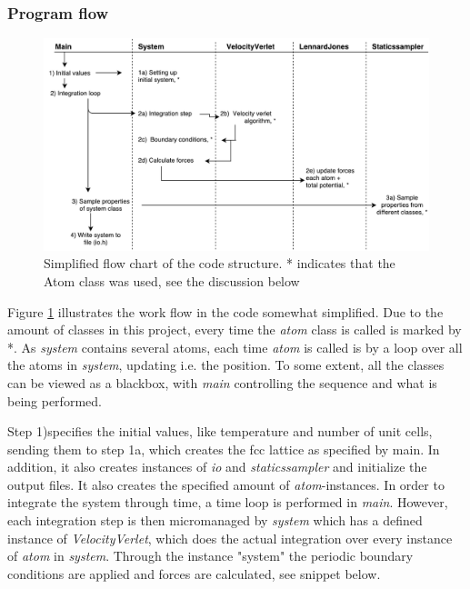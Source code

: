 \subsubsection{Program flow}

\begin{figure}[H]
	\centering
	\includegraphics[width=1\linewidth]{../figures/klasser_proj5}
	\caption{Simplified flow chart of the code structure. * indicates that the Atom class was used, see the discussion below}
	\label{fig:klasserproj5}
\end{figure}

Figure \ref{fig:klasserproj5} illustrates the work flow in the code somewhat simplified. Due to the amount of classes in this project, every time the \textit{atom} class is called is marked by *. As  \textit{system} contains several atoms, each time \textit{atom} is called is by a loop over all the atoms in \textit{system}, updating i.e. the position. To some extent, all the classes can be viewed as a blackbox, with \textit{main} controlling the sequence and what is being performed. 

Step 1)specifies the initial values, like temperature and number of unit cells, sending them to step 1a, which creates the fcc lattice as specified by main. In addition, it also creates instances of \textit{io} and \textit{staticssampler} and initialize  the output files.  It also creates the specified amount of \textit{atom}-instances. In order to integrate the system through time, a time loop is performed in \textit{main}. However, each integration step is then micromanaged by \textit{system} which has a defined instance of \textit{VelocityVerlet}, which does the actual integration over every instance of \textit{atom} in \textit{system}. Through the instance "system" the periodic boundary conditions are applied and forces are calculated, see snippet below. 

